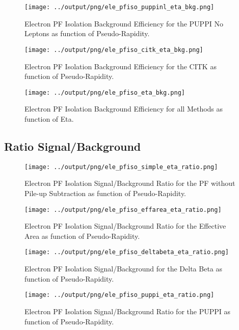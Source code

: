 \documentclass[11pt]{book}
\begin{document}
\begin{figure}[htb]
\centering
\texttt{[image: ../output/png/ele\_pfiso\_puppinl\_eta\_bkg.png]}
\caption{Electron PF Isolation Background Efficiency for the PUPPI No Leptons as function of Pseudo-Rapidity.}
\label{fig:ele_pfiso_eta_bkg_puppinl}
\end{figure}

\begin{figure}[htb]
\centering
\texttt{[image: ../output/png/ele\_pfiso\_citk\_eta\_bkg.png]}
\caption{Electron PF Isolation Background Efficiency for the CITK as function of Pseudo-Rapidity.}
\label{fig:ele_pfiso_eta_bkg_citk}
\end{figure}

\begin{figure}[htb]
\centering
\texttt{[image: ../output/png/ele\_pfiso\_eta\_bkg.png]}
\caption{Electron PF Isolation Background Efficiency for all Methods as function of Eta.}
\label{fig:ele_pfiso_eta_bkg}
\end{figure}
\clearpage

\subsection{Ratio Signal/Background}
\begin{figure}[htb]
\centering
\texttt{[image: ../output/png/ele\_pfiso\_simple\_eta\_ratio.png]}
\caption{Electron PF Isolation Signal/Background Ratio for the PF without Pile-up Subtraction as function of Pseudo-Rapidity.}
\label{fig:ele_pfiso_eta_ratio_simple}
\end{figure}


\begin{figure}[htb]
\centering
\texttt{[image: ../output/png/ele\_pfiso\_effarea\_eta\_ratio.png]}
\caption{Electron PF Isolation Signal/Background Ratio for the Effective Area as function of Pseudo-Rapidity.}
\label{fig:ele_pfiso_eta_ratio_effarea}
\end{figure}

\begin{figure}[htb]
\centering
\texttt{[image: ../output/png/ele\_pfiso\_deltabeta\_eta\_ratio.png]}
\caption{Electron PF Isolation Signal/Background for the Delta Beta as function of Pseudo-Rapidity.}
\label{fig:ele_pfiso_eta_ratio_deltabeta}
\end{figure}

\begin{figure}[htb]
\centering
\texttt{[image: ../output/png/ele\_pfiso\_puppi\_eta\_ratio.png]}
\caption{Electron PF Isolation Signal/Background Ratio for the PUPPI as function of Pseudo-Rapidity.}
\label{fig:ele_pfiso_eta_ratio_puppi}
\end{figure}
\end{document}
